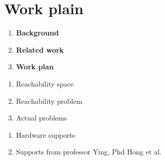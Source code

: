 \documentclass[aspectratio=1610,18pt]{ctexbeamer}
\begin{document}
\section{Work plain}
\begin{frame}
  \begin{enumerate}
    \Large
    \item \textbf{Background}
    \item \textbf{Related work}
    \item \textbf{Work plan}
  \end{enumerate}
\end{frame}
\begin{frame}
  \begin{enumerate}
    \Large
    \item Reachability space
    \item Reachability problem
    \item Actual problems
  \end{enumerate}
\end{frame}
\begin{frame}
  \begin{enumerate}
    \Large
    \item Hardware supports
    \item Supports from professor Ying, Phd Hong et al.
  \end{enumerate}
\end{frame}
\end{document}
